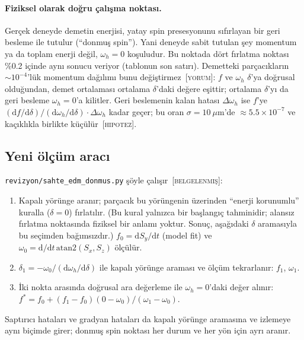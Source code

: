 \documentclass[11pt,a4paper]{article}
\newcommand{\kod}[1]{{\XeTeXinterchartokenstate=0\texttt{#1}}}
\newcommand{\BEL}{\textsc{[belgelenmiş]}}
\newcommand{\YOR}{\textsc{[yorum]}}
\newcommand{\HIP}{\textsc{[hipotez]}}
\begin{document}
\paragraph{Fiziksel olarak doğru çalışma noktası.} Gerçek deneyde demetin enerjisi, yatay spin
presesyonunu sıfırlayan bir geri besleme ile tutulur (``donmuş spin''). Yani deneyde sabit tutulan şey
momentum ya da toplam enerji değil, $\omega_h=0$ koşuludur. Bu noktada dört fırlatma noktası \%0.2 içinde
aynı sonucu veriyor (tablonun son satırı). Demetteki parçacıkların $\sim10^{-4}$'lük momentum dağılımı
bunu değiştirmez~\YOR: $f$ ve $\omega_h$ $\delta$'ya doğrusal olduğundan, demet ortalaması ortalama
$\delta$'daki değere eşittir; ortalama $\delta$'yı da geri besleme $\omega_h=0$'a kilitler. Geri beslemenin
kalan hatası $\Delta\omega_h$ ise $f$'ye $(\mathrm{d}f/\mathrm{d}\delta)/(\mathrm{d}\omega_h/\mathrm{d}\delta)
\cdot\Delta\omega_h$ kadar geçer; bu oran $\sigma=10~\mu$m'de $\approx5.5\times10^{-7}$ ve kaçıklıkla
birlikte küçülür~\HIP.

\subsection{Yeni ölçüm aracı}
\kod{revizyon/sahte\_edm\_donmus.py} şöyle çalışır~\BEL:
\begin{enumerate}
\item Kapalı yörünge aranır; parçacık bu yörüngenin üzerinden ``enerji korunumlu'' kuralla ($\delta=0$)
fırlatılır. (Bu kural yalnızca bir başlangıç tahminidir; alansız fırlatma noktasında fiziksel bir anlamı
yoktur. Sonuç, aşağıdaki $\delta$ aramasıyla bu seçimden bağımsızdır.) $f_0=\mathrm{d}S_y/\mathrm{d}t$ (model fit) ve $\omega_0=\mathrm{d}/\mathrm{d}t\,\mathrm{atan2}(S_x,S_z)$ ölçülür.
\item $\delta_1=-\omega_0/(\mathrm{d}\omega_h/\mathrm{d}\delta)$ ile kapalı yörünge araması ve ölçüm
tekrarlanır: $f_1$, $\omega_1$.
\item İki nokta arasında doğrusal ara değerleme ile $\omega_h=0$'daki değer alınır:
$f^*=f_0+(f_1-f_0)(0-\omega_0)/(\omega_1-\omega_0)$.
\end{enumerate}
Saptırıcı hataları ve gradyan hataları da kapalı yörünge aramasına ve izlemeye aynı biçimde girer;
donmuş spin noktası her durum ve her yön için ayrı aranır.
\end{document}
